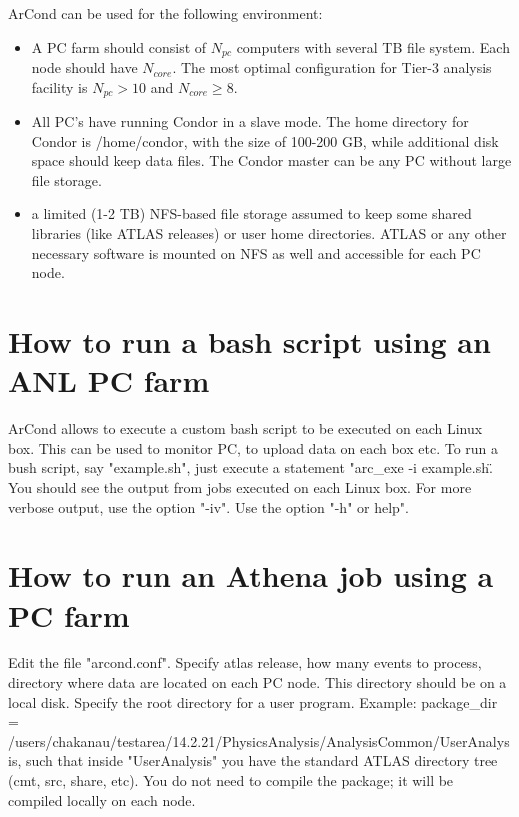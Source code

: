 \documentclass[a4paper]{book}
\begin{document}
ArCond can be used for  the following environment:

\begin{itemize}


\item
A PC farm should consist of $N_{pc}$ computers with several TB file system. 
Each node should have 
$N_{core}$. The most optimal configuration for Tier-3 analysis
facility is $N_{pc}>10$ and $N_{core}\ge 8$.

\item
All PC's have running Condor in a slave mode. The home directory for Condor  is /home/condor,
with the size of 100-200 GB, while additional disk space should keep data files.
The Condor master can be any PC without large file
storage.

\item
a limited (1-2 TB) NFS-based file storage assumed to keep some shared
libraries (like ATLAS releases) or user home directories.
ATLAS or any other necessary software is mounted on NFS as well and accessible for each PC node.

\end{itemize}



\section{How to run a bash script using an  ANL PC farm}

ArCond allows to execute a custom bash script to be executed on each Linux box.
This can be used to monitor PC, to upload data on each box etc.
To run a bush script, say "example.sh", just execute a statement "arc\_exe -i example.sh\".
You should see the output from jobs executed on each Linux box.
For more verbose output, use the option "-iv".
Use the option "-h" or help". 
  




\section{How to run an Athena job using a PC farm}

Edit the file "arcond.conf". Specify atlas release, how many events to process, directory
where data are located on each PC node. This directory should be on a local  disk.
Specify the root directory for a user program.  
Example: 
package\_dir = /users/chakanau/testarea/14.2.21/PhysicsAnalysis/AnalysisCommon/UserAnalysis, such that
inside "UserAnalysis" you have the standard ATLAS directory tree (cmt, src, share, etc).
You do not need to compile the package; it will be compiled locally on each node.
\end{document}
